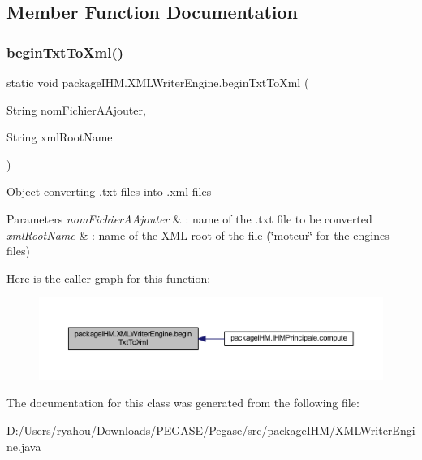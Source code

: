 \subsection{Member Function Documentation}
\mbox{\label{classpackage_i_h_m_1_1_x_m_l_writer_engine_a034600829c2639024d05ca1f8817548d}} 
\subsubsection{\texorpdfstring{begin\+Txt\+To\+Xml()}{beginTxtToXml()}}
{\footnotesize\ttfamily static void package\+I\+H\+M.\+X\+M\+L\+Writer\+Engine.\+begin\+Txt\+To\+Xml (\begin{DoxyParamCaption}\item[{String}]{nom\+Fichier\+A\+Ajouter,  }\item[{String}]{xml\+Root\+Name }\end{DoxyParamCaption})\hspace{0.3cm}{\ttfamily [static]}}

Object converting .txt files into .xml files 
\begin{DoxyParams}{Parameters}
{\em nom\+Fichier\+A\+Ajouter} & \+: name of the .txt file to be converted \\
\hline
{\em xml\+Root\+Name} & \+: name of the X\+ML root of the file (\char`\"{}moteur\char`\"{} for the engines files) \\
\hline
\end{DoxyParams}
Here is the caller graph for this function\+:
\nopagebreak
\begin{figure}[H]
\begin{center}
\leavevmode
\includegraphics[width=350pt]{classpackage_i_h_m_1_1_x_m_l_writer_engine_a034600829c2639024d05ca1f8817548d_icgraph}
\end{center}
\end{figure}


The documentation for this class was generated from the following file\+:\begin{DoxyCompactItemize}
\item 
D\+:/\+Users/ryahou/\+Downloads/\+P\+E\+G\+A\+S\+E/\+Pegase/src/package\+I\+H\+M/X\+M\+L\+Writer\+Engine.\+java\end{DoxyCompactItemize}
